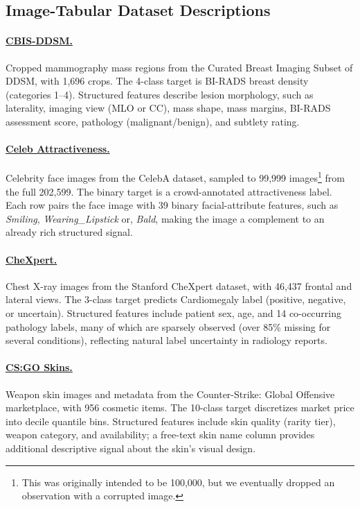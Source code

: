 \documentclass{llmxive}
\begin{document}
\subsection{Image-Tabular Dataset Descriptions}

\paragraph{\href{https://www.kaggle.com/datasets/awsaf49/cbis-ddsm-breast-cancer-image-dataset}{CBIS-DDSM.}} Cropped mammography mass regions from the Curated Breast Imaging Subset of DDSM, with 1,696 crops.
The 4-class target is BI-RADS breast density (categories 1--4).
Structured features describe lesion morphology, such as laterality, imaging view (MLO or CC), mass shape, mass margins, BI-RADS assessment score, pathology (malignant/benign), and subtlety rating.

\paragraph{\href{https://www.kaggle.com/datasets/jessicali9530/celeba-dataset}{Celeb Attractiveness.}} Celebrity face images from the CelebA dataset, sampled to 99,999 images\footnote{This was originally intended to be 100,000, but we eventually dropped an observation with a corrupted image.} from the full 202,599. The binary target is a crowd-annotated attractiveness label.
Each row pairs the face image with 39 binary facial-attribute features, such as \textit{Smiling}, \textit{Wearing\_Lipstick} or, \textit{Bald}, making the image a complement to 
an already rich structured signal.

\paragraph{\href{https://www.kaggle.com/datasets/ashery/chexpert}{CheXpert.}} Chest X-ray images from the Stanford CheXpert dataset, with 46,437 frontal and lateral views.
The 3-class target predicts Cardiomegaly label (positive, negative, or uncertain).
Structured features include patient sex, age, and 14 co-occurring pathology labels, many of which are sparsely observed (over 85\% missing for several conditions), reflecting natural label uncertainty in radiology reports.

\paragraph{\href{https://figshare.com/ndownloader/files/38077458}{CS:GO Skins.}} Weapon skin images and metadata from the Counter-Strike: Global Offensive marketplace, with 956 cosmetic items.
The 10-class target discretizes market price into decile quantile bins.
Structured features include skin quality (rarity tier), weapon category, and availability; a free-text skin name column provides additional descriptive signal about the skin's visual design.
\end{document}
